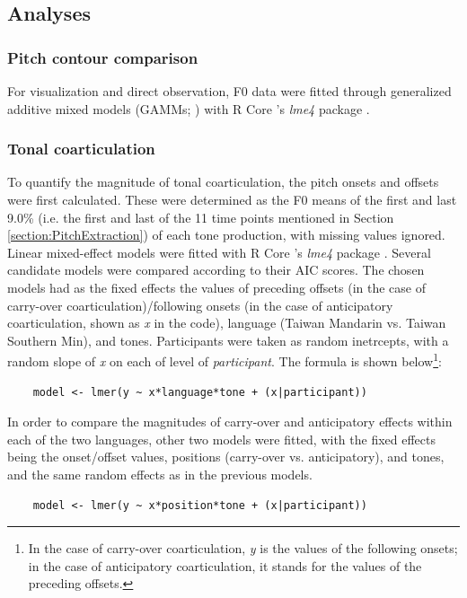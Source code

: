 \documentclass[12pt]{report}
\begin{document}
\begin{CJK}{UTF8}{bsmi}
\subsection{Analyses}
\subsubsection{Pitch contour comparison}
For visualization and direct observation, F0 data were fitted through generalized additive mixed models (GAMMs; \citealp{Wieling2018}) with R Core \citep{RCoreTeam2019}’s \textit{lme4} package \citep{Batesetal2015}.

\subsubsection{Tonal coarticulation}
To quantify the magnitude of tonal coarticulation, the pitch onsets and offsets were first calculated. These were determined as the F0 means of the first and last 9.0\% (i.e. the first and last of the 11 time points mentioned in Section \ref{section:PitchExtraction}) of each tone production, with missing values ignored. Linear mixed-effect models were fitted with R Core \citep{RCoreTeam2019}’s \textit{lme4} package \citep{Batesetal2015}. Several candidate models were compared according to their AIC scores. The chosen models had as the fixed effects the values of preceding offsets (in the case of carry-over coarticulation)/following onsets (in the case of anticipatory coarticulation, shown as \textit{x} in the code), language (Taiwan Mandarin vs. Taiwan Southern Min), and tones. Participants were taken as random inetrcepts, with a random slope of \textit{x} on each of level of \textit{participant}. The formula is shown below\footnote{In the case of carry-over coarticulation, \textit{y} is the values of the following onsets; in the case of anticipatory coarticulation, it stands for the values of the preceding offsets.}:

\begin{lstlisting}
    model <- lmer(y ~ x*language*tone + (x|participant))
\end{lstlisting}

In order to compare the magnitudes of carry-over and anticipatory effects within each of the two languages, other two models were fitted, with the fixed effects being the onset/offset values, positions (carry-over vs. anticipatory), and tones, and the same random effects as in the previous models.

\begin{lstlisting}
    model <- lmer(y ~ x*position*tone + (x|participant))
\end{lstlisting}


\end{CJK}
\end{document}
